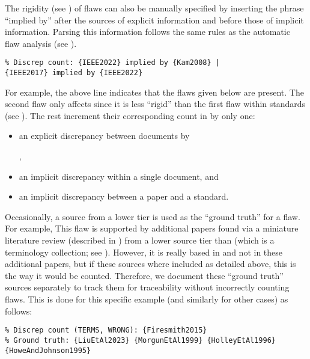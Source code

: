 The rigidity (see ) of flaws can also be manually
specified by inserting the phrase ``implied by'' after the sources of explicit
information and before those of implicit information. Parsing this information
follows the same rules as the automatic flaw analysis
(see ).
\begin{displayquote}
    \texttt{\% Discrep count: \{IEEE2022\} implied by \{Kam2008\} |\\
        \displayNL \{IEEE2017\} implied by \{IEEE2022\}}
\end{displayquote}
For example, the above line indicates that the flaws given below are
present. The second flaw only affects  since it
is less ``rigid'' than the first flaw within standards (see ).
The rest increment their corresponding count in
 by only one:
\begin{itemize}
    \item an explicit discrepancy between documents by
          \begin{NoHyper}\citeauthor{IEEE2022}\end{NoHyper},
    \item an implicit discrepancy within a single document, and
    \item an implicit discrepancy between a paper and a standard.
\end{itemize}

Occasionally, a source from a lower tier is used as the ``ground truth'' for a
flaw. For example, \tolTestingDiscrep*{} This flaw is supported
by additional papers found via a miniature literature review (described in
) from a lower source tier than \citep{Firesmith2015}
(which is a terminology collection; see ). However, it
is really based in \citep{Firesmith2015} and not in these
additional papers, but if these sources where included as detailed above,
this is the way it would be counted. Therefore, we document these ``ground
truth'' sources separately to track them for traceability without incorrectly
counting flaws. This is done for this specific example (and similarly
for other cases) as follows:
\begin{displayquote}
    \texttt{\% Discrep count (TERMS, WRONG): \{Firesmith2015\}\\
        \% Ground truth: \{LiuEtAl2023\} \{MorgunEtAl1999\} \{HolleyEtAl1996\}
        \displayNL \{HoweAndJohnson1995\}}
\end{displayquote}

